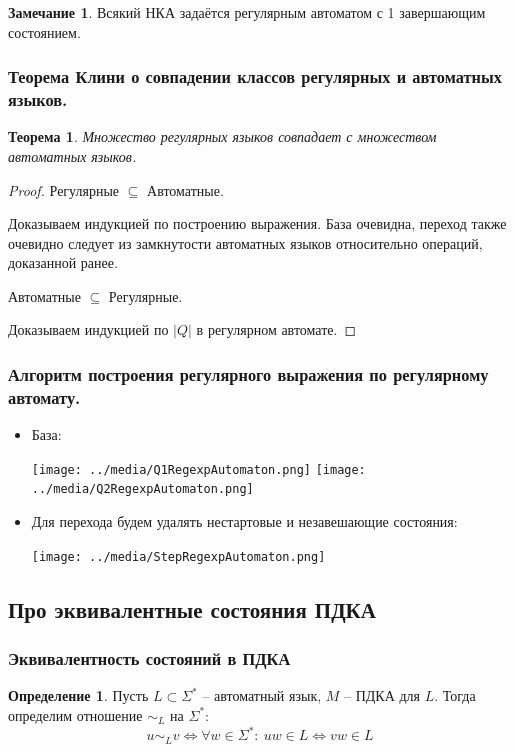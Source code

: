 \documentclass[a4paper,12pt]{article}
\theoremstyle{plain}
\newtheorem{theorem}{Теорема}[subsection]
\theoremstyle{definition}
\newtheorem{definition}{Определение}[subsection]
\newtheorem*{note}{Замечание}
\theoremstyle{remark}
\begin{document}
\begin{note}
	Всякий НКА задаётся регулярным автоматом с 1 завершающим состоянием.
\end{note}

\subsubsection*{Теорема Клини о совпадении классов регулярных и автоматных языков.}
\begin{theorem}
	Множество регулярных языков совпадает с множеством автоматных языков.
\end{theorem}
\begin{proof}
	Регулярные $\subseteq$ Автоматные.

	Доказываем индукцией по построению выражения. База очевидна, переход также очевидно следует из замкнутости автоматных языков относительно операций, доказанной ранее.

	Автоматные $\subseteq$ Регулярные.

	Доказываем индукцией по $|Q|$ в регулярном автомате.
\end{proof}

\subsubsection*{Алгоритм построения регулярного выражения по регулярному автомату.}
\begin{itemize}
	\item База:

	      \texttt{[image: ../media/Q1RegexpAutomaton.png]}
	      \texttt{[image: ../media/Q2RegexpAutomaton.png]}
	\item Для перехода будем удалять нестартовые и незавешающие состояния:

	      \texttt{[image: ../media/StepRegexpAutomaton.png]}
\end{itemize}
\subsection{Про эквивалентные состояния ПДКА}
\subsubsection*{Эквивалентность состояний в ПДКА}
\begin{definition}
	Пусть $L \subset \Sigma^*$ -- автоматный язык, $M$ -- ПДКА для $L$. Тогда определим отношение $\sim_L$ на $\Sigma^*$:
	\[
		u \sim_L v \Leftrightarrow \forall w \in \Sigma^* :\: uw \in L \Leftrightarrow vw \in L
	\]
\end{definition}
\end{document}

